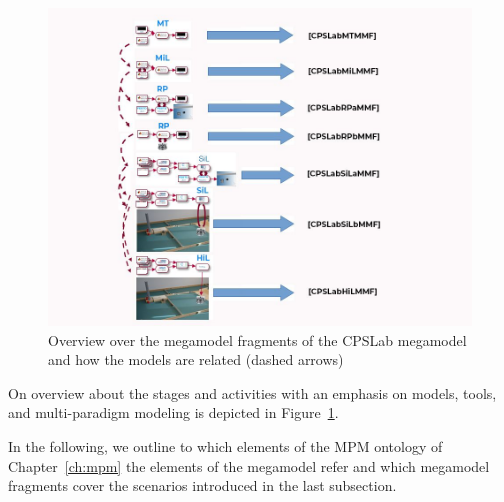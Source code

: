 \begin{figure}[p]
\centering
\includegraphics[scale=0.6]{figures/slide-fig.jpg}
\caption{Overview over the megamodel fragments of the CPSLab megamodel and how the models are related (dashed arrows)}
\label{fig:MMFig10}
\end{figure}



On overview about the stages and activities with an emphasis on models, tools, and multi-paradigm modeling is depicted in Figure~\ref{fig:MMFig10}.

In the following, we outline to which elements of the MPM ontology of Chapter~\ref{ch:mpm} the elements of the megamodel refer and which megamodel fragments cover the scenarios introduced in the last subsection.

